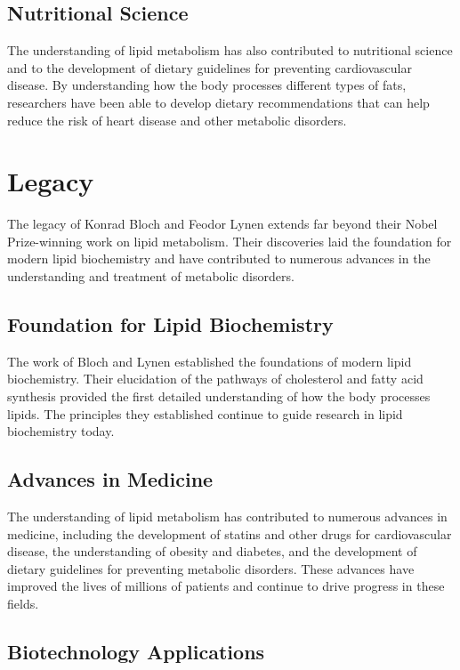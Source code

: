 \subsection{Nutritional Science}

The understanding of lipid metabolism has also contributed to nutritional science and to the development of dietary guidelines for preventing cardiovascular disease. By understanding how the body processes different types of fats, researchers have been able to develop dietary recommendations that can help reduce the risk of heart disease and other metabolic disorders.

\section{Legacy}

The legacy of Konrad Bloch and Feodor Lynen extends far beyond their Nobel Prize-winning work on lipid metabolism. Their discoveries laid the foundation for modern lipid biochemistry and have contributed to numerous advances in the understanding and treatment of metabolic disorders.

\subsection{Foundation for Lipid Biochemistry}

The work of Bloch and Lynen established the foundations of modern lipid biochemistry. Their elucidation of the pathways of cholesterol and fatty acid synthesis provided the first detailed understanding of how the body processes lipids. The principles they established continue to guide research in lipid biochemistry today.

\subsection{Advances in Medicine}

The understanding of lipid metabolism has contributed to numerous advances in medicine, including the development of statins and other drugs for cardiovascular disease, the understanding of obesity and diabetes, and the development of dietary guidelines for preventing metabolic disorders. These advances have improved the lives of millions of patients and continue to drive progress in these fields.

\subsection{Biotechnology Applications}

